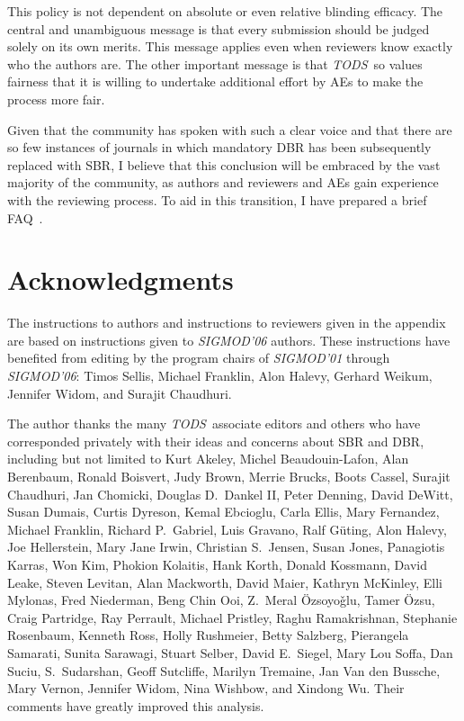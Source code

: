 \documentclass[acmtods,acmnow]{acmtrans2m}
\newcommand{\tods}{{\em TODS\/}}
\begin{document}
This policy is not dependent on absolute or even relative blinding
efficacy. The central and unambiguous message is that every submission
should be judged solely on its own merits. This message applies even when
reviewers know exactly who the authors are.
The other important message is that \tods\ so values fairness that it is
willing to undertake additional effort by AEs to make the process
more fair.

Given that the community has spoken with such a clear
voice and that there are so few instances of journals in which mandatory DBR
has been subsequently replaced with SBR, I believe that
this conclusion will be embraced by the vast majority of the
community, as authors and reviewers and AEs gain experience with the
reviewing process.  To aid in this transition, I have prepared a brief
FAQ~\cite{FAQ}.

\section*{Acknowledgments}
The instructions to authors and instructions to reviewers given in the
appendix are based on instructions given to
{\em SIGMOD'06} authors. These instructions have benefited from editing by
the program chairs of {\em SIGMOD'01} through {\em SIGMOD'06}: Timos Sellis,
Michael Franklin, Alon Halevy, Gerhard Weikum, Jennifer
Widom, and Surajit Chaudhuri.

The author thanks the many \tods\ associate editors and others who have
corresponded privately with their ideas and concerns about SBR and DBR,
including but not limited to Kurt Akeley, Michel Beaudouin-Lafon, Alan
Berenbaum, Ronald Boisvert, Judy Brown, Merrie Brucks, Boots Cassel, Surajit
Chaudhuri, Jan Chomicki, Douglas D.~Dankel II, Peter Denning, David DeWitt,
Susan Dumais, Curtis Dyreson, Kemal Ebcioglu, Carla Ellis, Mary Fernandez,
Michael Franklin, Richard P.~Gabriel, Luis Gravano, Ralf G\"{u}ting, Alon
Halevy, Joe Hellerstein, Mary Jane Irwin, Christian S.~Jensen, Susan Jones,
Panagiotis Karras, Won Kim, Phokion Kolaitis, Hank Korth, Donald Kossmann,
David Leake, Steven Levitan, Alan Mackworth, David Maier, Kathryn McKinley,
Elli Mylonas, Fred Niederman, Beng Chin Ooi, Z.~Meral \"{O}zsoyo\v{g}lu,
Tamer \"{O}zsu, Craig Partridge, Ray Perrault, Michael Pristley, Raghu
Ramakrishnan, Stephanie Rosenbaum, Kenneth Ross, Holly Rushmeier, Betty
Salzberg, Pierangela Samarati, Sunita Sarawagi, Stuart Selber, David
E.~Siegel, Mary Lou Soffa, Dan Suciu, S.~Sudarshan, Geoff Sutcliffe, Marilyn
Tremaine, Jan Van den Bussche, Mary Vernon, Jennifer Widom, Nina Wishbow,
and Xindong Wu.  Their comments have greatly improved this analysis.
\end{document}
